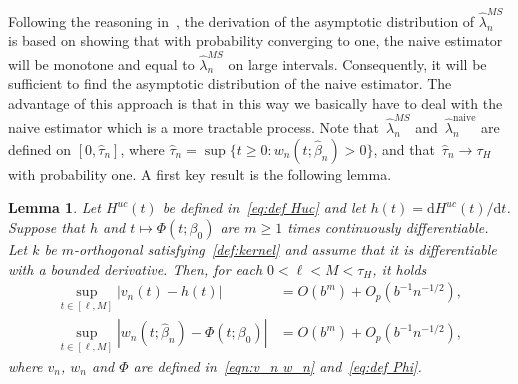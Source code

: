 \documentclass[11pt,reqno]{amsart}
\theoremstyle{definition}
\theoremstyle{plain}
\newtheorem{lemma}[de]{Lemma}
\theoremstyle{remark}
\begin{document}
Following the reasoning in~\cite{GJW10}, the derivation of the asymptotic distribution of $\hat{\lambda}^{MS}_n$
is based on showing that with probability converging to one,
the naive estimator will be monotone and equal to $\hat{\lambda}^{MS}_n$ on large intervals.
Consequently, it will be sufficient to find the asymptotic distribution of the naive estimator.
The advantage of this approach is that in this way we basically have to deal with the naive estimator which is a more tractable process.
Note that~$\hat{\lambda}^{MS}_n$ and~$\hat{\lambda}_n^{\mathrm{naive}}$ are defined on $[0,\hat\tau_n]$, where
$\hat\tau_n=\sup\{t\geq 0:w_n(t;\hat{\beta}_n)>0\}$, and that~$\hat\tau_n\to \tau_H$ with probability one.
A first key result is the following lemma.
\begin{lemma}
\label{le:1}
Let $H^{uc}(t)$ be defined in~\eqref{eq:def Huc} and let $h(t)=\mathrm{d}H^{uc}(t)/\mathrm{d}t$.
Suppose that $h$ and $t\mapsto\Phi(t;\beta_0)$ are $m\geq 1$ times continuously differentiable.
Let $k$ be $m$-orthogonal satisfying~\eqref{def:kernel} and assume that it is differentiable with a bounded derivative.
Then, for each $0<\ell<M<\tau_H$, it holds
\begin{equation}
\label{eqn:lemma1-1}
\begin{split}
\sup_{t\in[\ell,M]}|v_n(t)-h(t)|
&=
O(b^m)+O_p(b^{-1}n^{-1/2}),\\
\sup_{t\in[\ell,M]}|w_n(t;\hat{\beta}_n)-\Phi(t;\beta_0)|
&=
O(b^m)+O_p(b^{-1}n^{-1/2}),
\end{split}
\end{equation}
where $v_n$, $w_n$ and $\Phi$ are defined in~\eqref{eqn:v_n w_n} and~\eqref{eq:def Phi}.
\end{lemma}
\end{document}
